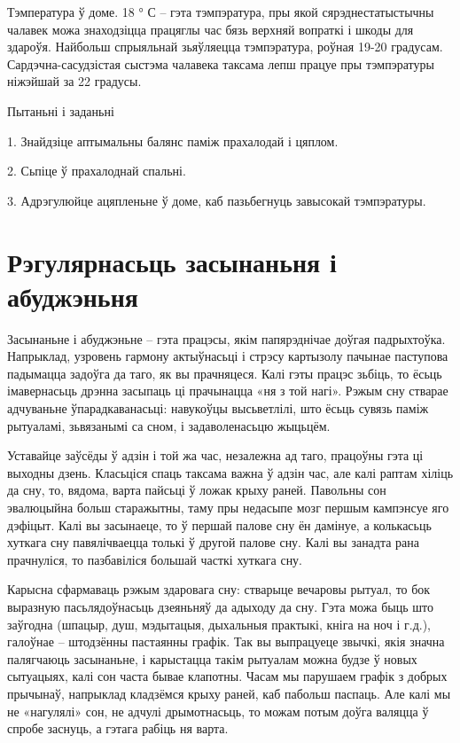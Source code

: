 Тэмпература ў доме. 18 ° С – гэта тэмпэратура, пры якой сярэднестатыстычны чалавек можа знаходзіцца працяглы час бязь верхняй вопраткі і шкоды для здароўя. Найбольш спрыяльнай зьяўляецца тэмпэратура, роўная 19-20 градусам. Сардэчна-сасудзістая сыстэма чалавека таксама лепш працуе пры тэмпэратуры ніжэйшай за 22 градусы.

Пытаньні і заданьні

1. Знайдзіце аптымальны балянс паміж прахалодай і цяплом.

2. Сьпіце ў прахалоднай спальні.

3. Адрэгулюйце ацяпленьне ў доме, каб пазьбегнуць завысокай тэмпэратуры.


\section{Рэгулярнасьць засынаньня і абуджэньня}

Засынаньне і абуджэньне – гэта працэсы, якім папярэднічае доўгая падрыхтоўка. Напрыклад, узровень гармону актыўнасьці і стрэсу картызолу пачынае паступова падымацца задоўга да таго, як вы прачняцеся. Калі гэты працэс зьбіць, то ёсьць імавернасьць дрэнна засыпаць ці прачынацца «ня з той нагі». Рэжым сну стварае адчуваньне ўпарадкаванасьці: навукоўцы высьветлілі, што ёсьць сувязь паміж рытуаламі, зьвязанымі са сном, і задаволенасьцю жыцьцём.

Уставайце заўсёды ў адзін і той жа час, незалежна ад таго, працоўны гэта ці выходны дзень. Класьціся спаць таксама важна ў адзін час, але калі раптам хіліць да сну, то, вядома, варта пайсьці ў ложак крыху раней. Павольны сон эвалюцыйна больш старажытны, таму пры недасыпе мозг першым кампэнсуе яго дэфіцыт. Калі вы засынаеце, то ў першай палове сну ён дамінуе, а колькасьць хуткага сну павялічваецца толькі ў другой палове сну. Калі вы занадта рана прачнуліся, то пазбавіліся большай часткі хуткага сну.

Карысна сфармаваць рэжым здаровага сну: стварыце вечаровы рытуал, то бок выразную пасьлядоўнасьць дзеяньняў да адыходу да сну. Гэта можа быць што заўгодна (шпацыр, душ, мэдытацыя, дыхальныя практыкі, кніга на ноч і г.д.), галоўнае – штодзённы пастаянны графік. Так вы выпрацуеце звычкі, якія значна палягчаюць засынаньне, і карыстацца такім рытуалам можна будзе ў новых сытуацыях, калі сон часта бывае клапотны. Часам мы парушаем графік з добрых прычынаў, напрыклад кладзёмся крыху раней, каб пабольш паспаць. Але калі мы не «нагулялі» сон, не адчулі дрымотнасьць, то можам потым доўга валяцца ў спробе заснуць, а гэтага рабіць ня варта.

